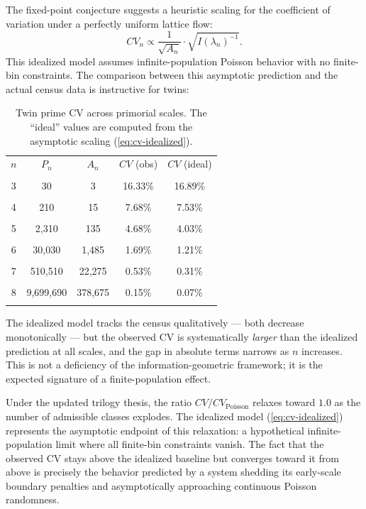 \documentclass[11pt]{article}
\theoremstyle{remark}
\begin{document}
The fixed-point conjecture suggests a heuristic scaling for the
coefficient of variation under a perfectly uniform lattice flow:
\begin{equation}
CV_n \propto \frac{1}{\sqrt{A_n}} \cdot \sqrt{I(\lambda_n)^{-1}}.
\label{eq:cv-idealized}
\end{equation}
This idealized model assumes infinite-population Poisson behavior
with no finite-bin constraints. The comparison between this
asymptotic prediction and the actual census data is instructive
for twins:

\begin{table}[h]
\centering
\begin{tabular}{ccccc}
\toprule
$n$ & $P_n$ & $A_n$ & $CV$ (obs) & $CV$ (ideal) \\\\
\midrule
3 & 30 & 3 & 16.33\% & 16.89\% \\\\
4 & 210 & 15 & 7.68\% & 7.53\% \\\\
5 & 2,310 & 135 & 4.68\% & 4.03\% \\\\
6 & 30,030 & 1,485 & 1.69\% & 1.21\% \\\\
7 & 510,510 & 22,275 & 0.53\% & 0.31\% \\\\
8 & 9,699,690 & 378,675 & 0.15\% & 0.07\% \\\\
\bottomrule
\end{tabular}
\caption{Twin prime CV across primorial scales. The ``ideal'' values
are computed from the asymptotic scaling
(\ref{eq:cv-idealized}).}
\end{table}

The idealized model tracks the census qualitatively — both decrease
monotonically — but the observed CV is systematically \emph{larger}
than the idealized prediction at all scales, and the gap in absolute
terms narrows as $n$ increases. This is not a deficiency of the
information-geometric framework; it is the expected signature of a
finite-population effect.

Under the updated trilogy thesis, the ratio $CV/CV_{\mathrm{Poisson}}$
relaxes toward $1.0$ as the number of admissible classes explodes.
The idealized model (\ref{eq:cv-idealized}) represents the asymptotic
endpoint of this relaxation: a hypothetical infinite-population limit
where all finite-bin constraints vanish. The fact that the observed
CV stays above the idealized baseline but converges toward it from
above is precisely the behavior predicted by a system shedding its
early-scale boundary penalties and asymptotically approaching
continuous Poisson randomness.
\end{document}
